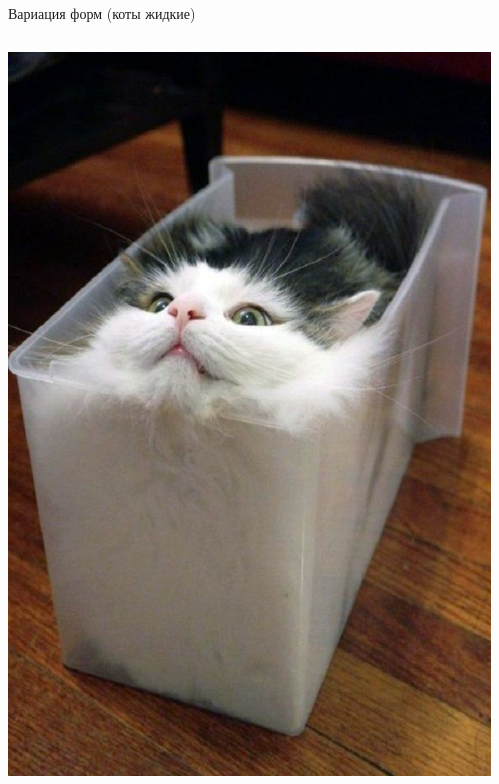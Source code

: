 \documentclass[aspectratio=169, professionalfonts]{beamer}
\begin{document}
\begin{frame}{Вариация форм (коты жидкие)}
    \begin{columns}
        \begin{column}{.25\linewidth}
            \centering
            \includegraphics[width=\linewidth]{figures/fig22-cat.jpg}
        \end{column}
        \begin{column}{.25\linewidth}
            \centering

\end{column}
\end{columns}
\end{frame}
\end{document}
